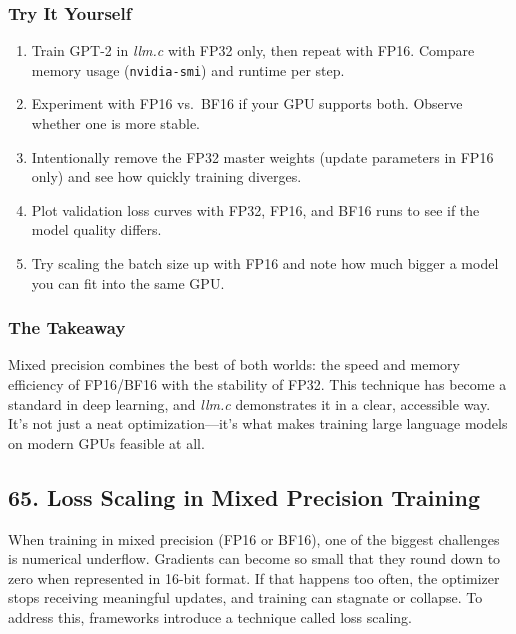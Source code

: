 \documentclass[
  letterpaper,
  DIV=11,
  numbers=noendperiod]{scrreprt}
\providecommand{\tightlist}{%
  \setlength{\itemsep}{0pt}\setlength{\parskip}{0pt}}
\begin{document}
\subsubsection{Try It Yourself}\label{try-it-yourself-52}

\begin{enumerate}
\def\labelenumi{\arabic{enumi}.}
\tightlist
\item
  Train GPT-2 in \emph{llm.c} with FP32 only, then repeat with FP16.
  Compare memory usage (\texttt{nvidia-smi}) and runtime per step.
\item
  Experiment with FP16 vs.~BF16 if your GPU supports both. Observe
  whether one is more stable.
\item
  Intentionally remove the FP32 master weights (update parameters in
  FP16 only) and see how quickly training diverges.
\item
  Plot validation loss curves with FP32, FP16, and BF16 runs to see if
  the model quality differs.
\item
  Try scaling the batch size up with FP16 and note how much bigger a
  model you can fit into the same GPU.
\end{enumerate}

\subsubsection{The Takeaway}\label{the-takeaway-53}

Mixed precision combines the best of both worlds: the speed and memory
efficiency of FP16/BF16 with the stability of FP32. This technique has
become a standard in deep learning, and \emph{llm.c} demonstrates it in
a clear, accessible way. It's not just a neat optimization---it's what
makes training large language models on modern GPUs feasible at all.

\subsection{65. Loss Scaling in Mixed Precision
Training}\label{loss-scaling-in-mixed-precision-training}

When training in mixed precision (FP16 or BF16), one of the biggest
challenges is numerical underflow. Gradients can become so small that
they round down to zero when represented in 16-bit format. If that
happens too often, the optimizer stops receiving meaningful updates, and
training can stagnate or collapse. To address this, frameworks introduce
a technique called loss scaling.
\end{document}
